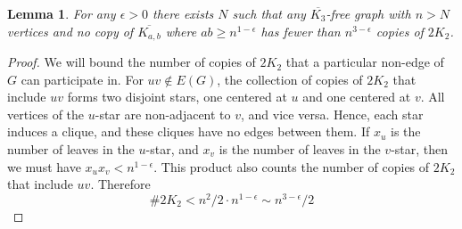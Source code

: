 \documentclass{article}
\newtheorem{lemma}{Lemma}
\begin{document}
\begin{lemma}
	For any $\epsilon > 0$ there exists $N$ such that any $\overline{K_3}$-free graph with $n>N$ vertices and no copy of $\overline{K_{a,b}}$ where $ab \geq n^{1-\epsilon}$ has fewer than $n^{3-\epsilon}$ copies of $2K_2$. 
\end{lemma}
\begin{proof}

We will bound the number of copies of $2K_2$ that a particular non-edge of $G$ can participate in.  For $uv \notin E(G)$, the collection of copies of $2K_2$ that include $uv$ forms two disjoint stars, one centered at $u$ and one centered at $v$.  All vertices of the $u$-star are non-adjacent to $v$, and vice versa.  Hence, each star induces a clique, and these cliques have no edges between them.  If $x_u$ is the number of leaves in the $u$-star, and $x_v$ is the number of leaves in the $v$-star, then we must have $x_ux_v < n^{1-\epsilon}$. This product also counts the number of copies of $2K_2$ that include $uv$. Therefore 
\[\#2K_2 < n^2/2\cdot n^{1-\epsilon}\sim n^{3-\epsilon}/2\]
\end{proof}
\end{document}
